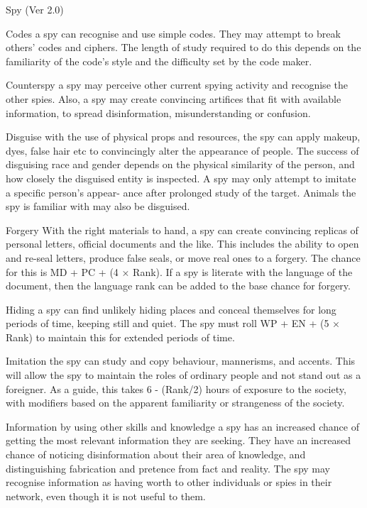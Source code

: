\begin{Chapter}{Spy (Ver 2.0)}
\begin{Description}
\item[Codes] a spy can recognise and use simple codes.  They may
  attempt to break others’ codes and ciphers.  The length of study
  required to do this depends on the familiarity of the code’s style
  and the difficulty set by the code maker.

\item[Counterspy] a spy may perceive other current spying activity and
  recognise the other spies. Also, a spy may create convincing
  artifices that fit with available information, to spread
  disinformation, misunderstanding or confusion.

\item[Disguise] with the use of physical props and resources, the spy
  can apply makeup, dyes, false hair etc to convincingly alter the
  appearance of people.  The success of disguising race and gender
  depends on the physical similarity of the person, and how closely
  the disguised entity is inspected. A spy may only attempt to imitate
  a specific person’s appear- ance after prolonged study of the
  target.  Animals the spy is familiar with may also be disguised.

\item[Forgery] With the right materials to hand, a spy can create
  convincing replicas of personal letters, official documents and the
  like.  This includes the ability to open and re-seal letters,
  produce false seals, or move real ones to a forgery.  The chance for
  this is MD + PC + (4 × Rank). If a spy is literate with the language
  of the document, then the language rank can be added to the base
  chance for forgery.

\item[Hiding] a spy can find unlikely hiding places and conceal
  themselves for long periods of time, keeping still and quiet. The
  spy must roll WP + EN + (5 × Rank) to maintain this for extended
  periods of time.

\item[Imitation] the spy can study and copy behaviour, mannerisms, and
  accents. This will allow the spy to maintain the roles of ordinary
  people and not stand out as a foreigner.  As a guide, this takes 6 -
  (Rank/2) hours of exposure to the society, with modifiers based on
  the apparent familiarity or strangeness of the society.

\item[Information] by using other skills and knowledge a spy has an
  increased chance of getting the most relevant information they are
  seeking.  They have an increased chance of noticing disinformation
  about their area of knowledge, and distinguishing fabrication and
  pretence from fact and reality.  The spy may recognise information
  as having worth to other individuals or spies in their network, even
  though it is not useful to them.


\end{Description}
\end{Chapter}

